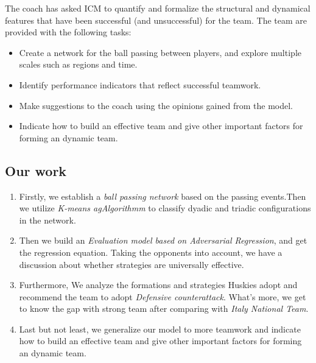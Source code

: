 \documentclass[12pt]{article}  %
\begin{document}
The coach has asked ICM to quantify and formalize the structural and dynamical features that have been successful (and unsuccessful) for the team. The team are provided with the following tasks:
\begin{itemize}
    \setlength{\parsep}{0ex} %
    \setlength{\topsep}{2ex} %
    \setlength{\itemsep}{1ex} %
    \item Create a network for the ball passing between players, and explore multiple scales such as regions and time.
    \item Identify performance indicators that reflect successful teamwork.
    \item Make suggestions to the coach using the opinions gained from the model.
    \item Indicate how to build an effective team and give other important factors for forming an dynamic team.
\end{itemize}



\subsection{Our work}

\begin{enumerate}[\bfseries 1.]
    \setlength{\parsep}{0ex} %
    \setlength{\topsep}{2ex} %
    \setlength{\itemsep}{1ex} %
    \item Firstly, we establish a \textit{ball passing network} based on the passing events.Then we utilize \textit{K-means agAlgorithmm} to classify dyadic and triadic configurations in the network.
    \item Then we build an \textit{Evaluation model based on Adversarial Regression}, and get the regression equation.  Taking the opponents into account, we have a discussion about whether strategies are universally effective.
    \item Furthermore, We analyze the formations and strategies Huskies adopt and recommend the team to adopt \textit{Defensive counterattack}. What's more, we get to know the gap with strong team after comparing with \textit{Italy National Team}.
    \item Last but not least, we generalize our model to more teamwork and indicate how to build an effective team and give other important factors for forming an dynamic team.
\end{enumerate}
\end{document}
